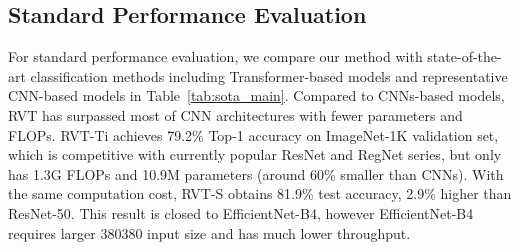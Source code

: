 \documentclass[10pt,twocolumn,letterpaper]{article}
\begin{document}
\subsection{Standard Performance Evaluation}
For standard performance evaluation, we compare our method with state-of-the-art classification methods including Transformer-based models and representative CNN-based models in Table~\ref{tab:sota_main}. Compared to CNNs-based models, RVT has surpassed most of CNN architectures with fewer parameters and FLOPs. RVT-Ti achieves 79.2\% Top-1 accuracy on ImageNet-1K validation set, which
is competitive with currently popular ResNet and RegNet series, but only has 1.3G FLOPs and 10.9M parameters (around 60\% smaller than CNNs). With the same computation cost, RVT-S obtains 81.9\% test accuracy, 2.9\% higher than ResNet-50. This result is closed to EfficientNet-B4, however EfficientNet-B4 requires larger 380380 input size and has much lower throughput.
\end{document}

